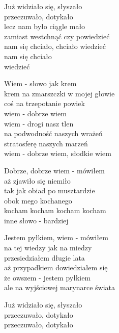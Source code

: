 \begin{text}
    Już widziało się, słyszało\\
    przeczuwało, dotykało\\
    lecz nam było ciągle mało\\
    zamiast westchnąć czy powiedzieć\\
    nam się chciało, chciało wiedzieć\\
    nam się chciało\\
    wiedzieć

    Wiem - słowo jak krem\\
    krem na zmarszczki w mojej głowie\\
    coś na trzepotanie powiek\\
    wiem - dobrze wiem\\
    wiem - drogi nasz tlen\\
    na podwodność naszych wrażeń\\
    stratosferę naszych marzeń\\
    wiem - dobrze wiem, słodkie wiem

    Dobrze, dobrze wiem - mówiłem\\
    aż zjawiło się niemiło\\
    tak jak obiad po musztardzie\\
    obok mego kochanego\\
    kocham kocham kocham kocham\\
    inne słowo - bardziej

    Jestem pyłkiem, wiem - mówiłem\\
    na tej wiedzy jak na miedzy\\
    przesiedziałem długie lata\\
    aż przypadkiem dowiedziałem się\\
    że owszem - jestem pyłkiem\\
    ale na wyjściowej marynarce świata

    Już widziało się, słyszało\\
    przeczuwało, dotykało\\
    przeczuwało, dotykało
\end{text}
\begin{chord}

\end{chord}